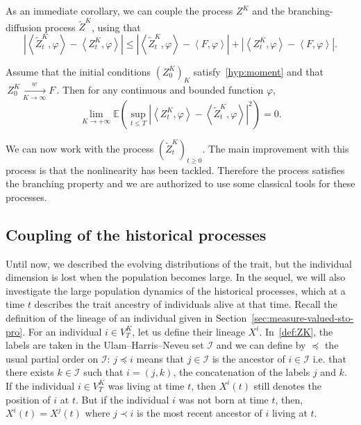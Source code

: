 \documentclass[10pt]{amsart}
\theoremstyle{definition}\newtheorem{defi}[theo]{Definition}\newtheorem{rema}[theo]{Remark}\newtheorem{exam}[theo]{Example}\newtheorem{exem}[theo]{Example}\newtheorem{nota}[theo]{Notation}
\newcommand{\Io}{\mathcal{I}}
\newcommand*\E{\mathbb{E}}
\begin{document}
As an immediate corollary, we can couple the process $Z^K$ and the branching-diffusion process $ \widetilde Z^{K}$, using that
\[
\left|\left\langle \widetilde Z^{K}_{t},\varphi\right\rangle - \left\langle Z^K_t,\varphi\right\rangle\right|\leq \left|\left\langle \widetilde Z^{K}_{t},\varphi\right\rangle - \left\langle F,\varphi\right\rangle\right|+\left|\left\langle Z^{K}_{t},\varphi\right\rangle - \left\langle F,\varphi\right\rangle\right|.
\]

\begin{prop}\label{proximity}
Assume that the initial conditions $(Z^K_0)_{K}$ satisfy~\eqref{hyp:moment} and that $\,{Z}^{K}_{0}\xrightarrow[K\to\infty]{w} F\,$. Then for any continuous and bounded function $\varphi$,
\[
\lim_{K \to +\infty}\E\left(\sup_{t \le T} \left|\left\langle Z^{K}_{t},\varphi\right\rangle-\left\langle\widetilde{Z}^{K}_{t},\varphi\right\rangle\right|^2\right) = 0.
\]
\end{prop}


We can now work with the process $(\widetilde{Z}^{K}_{t})_{t \ge 0}$. The main improvement with this process is that the nonlinearity has been tackled. Therefore the process satisfies the branching property and we are authorized to use some classical tools for these processes.



\subsection{Coupling of the historical processes}\label{section:coupling_historique}


Until now, we described the evolving distributions of the trait, but the individual dimension is lost when the population becomes large. In the sequel, we will also investigate the large population dynamics of the historical processes, which at a time $t$ describes the trait ancestry of individuals alive at that time. Recall the definition of the lineage of an individual given in Section~\ref{sec:measure-valued-sto-pro}. For an individual $i\in V^K_T$, let us define their lineage $X^i$. In~\eqref{def:ZK}, the labels are taken in the Ulam--Harris--Neveu set $\Io$ and we can define by $\preceq$ the usual partial order on $ \Io$: $j \preceq i$ means that $j\in \Io$ is the ancestor of $i\in \Io$ i.e. that there exists $k\in \Io$ such that $i=(j,k)$, the concatenation of the labels $j$ and $k$. If the individual $i\in {V}^K_{T}$ was living at time $t$, then ${X}^i(t)$ still denotes the position of $i$ at $t$. But if the individual $i$ was not born at time $t$, then, ${X}^i(t)={X}^j(t)$ where $j\prec i$ is the most recent ancestor of $i$ living at $t$.
\end{document}
